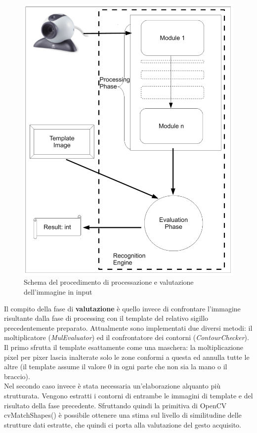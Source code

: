 \documentclass[a4paper,10pt, twocolumn]{article}
\begin{document}
  \begin{figure}[t]
    \centering    
    \caption{Schema del procedimento di processazione e valutazione dell'immagine in input}
    \label{reScheme}
    \includegraphics[scale=0.20]{recognitionEngineScheme}
  \end{figure}
  
  Il compito della fase di \textbf{valutazione} \`{e} quello invece di confrontare l'immagine
  risultante dalla fase di processing con il template del relativo sigillo precedentemente
  preparato. Attualmente sono implementati due diversi metodi: il moltiplicatore
  (\textit{MulEvaluator}) ed il confrontatore dei contorni (\textit{ContourChecker}).
  Il primo sfrutta il template esattamente come una maschera: la moltiplicazione 
  pixel per pixer lascia inalterate solo le zone conformi a questa ed annulla 
  tutte le altre (il template assume il valore 0 in ogni parte che non sia
  la mano o il braccio).\\
  Nel secondo caso invece \`{e} stata necessaria un'elaborazione alquanto 
  pi\`{u} strutturata. Vengono estratti i contorni di entrambe le immagini
  di template e del risultato della fase precedente. 
  Sfruttando quindi la primitiva di OpenCV cvMatchShapes() \`{e} 
  possibile ottenere una stima sul livello di similitudine delle strutture
  dati estratte, che quindi ci porta alla valutazione del gesto acquisito.
  
\end{document}
